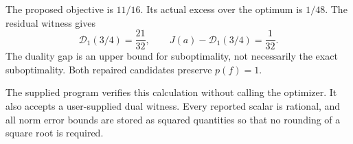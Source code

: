 The proposed objective is $11/16$. Its actual excess over the optimum is $1/48$. The residual witness gives
\[
 \mathcal D_1(3/4)=\frac{21}{32},\qquad
 J(a)-\mathcal D_1(3/4)=\frac1{32}.
\]
The duality gap is an upper bound for suboptimality, not necessarily the exact suboptimality. Both repaired candidates preserve $p(f)=1$.


The supplied program  verifies this calculation without calling the optimizer. It also accepts a user-supplied dual witness. Every reported scalar is rational, and all norm error bounds are stored as squared quantities so that no rounding of a square root is required.
